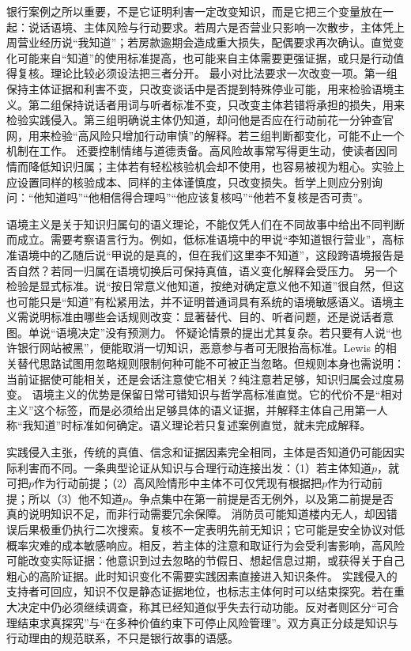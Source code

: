  银行案例之所以重要，不是它证明利害一定改变知识，而是它把三个变量放在一起：说话语境、主体风险与行动要求。若周六是否营业只影响一次散步，主体凭上周营业经历说“我知道”；若房款逾期会造成重大损失，配偶要求再次确认。直觉变化可能来自“知道”的使用标准提高，也可能来自主体需要更强证据，或只是行动值得复核。理论比较必须设法把三者分开。 最小对比法要求一次改变一项。第一组保持主体证据和利害不变，只改变谈话中是否提到特殊停业可能，用来检验语境主义。第二组保持说话者用词与听者标准不变，只改变主体若错将承担的损失，用来检验实践侵入。第三组明确说主体仍知道，却问他是否应在行动前花一分钟查官网，用来检验“高风险只增加行动审慎”的解释。若三组判断都变化，可能不止一个机制在工作。 还要控制情绪与道德责备。高风险故事常写得更生动，使读者因同情而降低知识归属；主体若有轻松核验机会却不使用，也容易被视为粗心。实验上应设置同样的核验成本、同样的主体谨慎度，只改变损失。哲学上则应分别询问：“他知道吗”“他相信得合理吗”“他应该复核吗”“他若不复核是否可责”。

语境主义是关于知识归属句的语义理论，不能仅凭人们在不同故事中给出不同判断而成立。需要考察语言行为。例如，低标准语境中的甲说“李知道银行营业”，高标准语境中的乙随后说“甲说的是真的，但在我们这里李不知道”，这段跨语境报告是否自然？若同一归属在语境切换后可保持真值，语义变化解释会受压力。 另一个检验是显式标准。说“按日常意义他知道，按绝对确定意义他不知道”很自然，但这也可能只是“知道”有松紧用法，并不证明普通词具有系统的语境敏感语义。语境主义需说明标准由哪些会话规则改变：显著替代、目的、听者问题，还是说话者意图。单说“语境决定”没有预测力。 怀疑论情景的提出尤其复杂。若只要有人说“也许银行网站被黑”，便能取消一切知识，恶意参与者可无限抬高标准。Lewis 的相关替代思路试图用忽略规则限制何种可能不可被正当忽略\parencite{lewis1996}。但规则本身也需说明：当前证据使可能相关，还是会话注意使它相关？纯注意若足够，知识归属会过度易变。 语境主义的优势是保留日常可错知识与哲学高标准直觉。它的代价不是“相对主义”这个标签，而是必须给出足够具体的语义证据，并解释主体自己用第一人称“我知道”时标准如何确定。语义理论若只复述案例直觉，就未完成解释。

实践侵入主张，传统的真值、信念和证据因素完全相同，主体是否知道仍可能因实际利害而不同\parencite{stanley2005}。一条典型论证从知识与合理行动连接出发：（1）若主体知道$p$，就可把$p$作为行动前提；（2）高风险情形中主体不可仅凭现有根据把$p$作为行动前提；所以（3）他不知道$p$。争点集中在第一前提是否无例外，以及第二前提是否真的说明知识不足，而非行动需要冗余保障。 消防员可能知道楼内无人，却因错误后果极重仍执行二次搜索。复核不一定表明先前无知识；它可能是安全协议对低概率灾难的成本敏感响应。相反，若主体的注意和取证行为会受利害影响，高风险可能改变实际证据：他意识到过去忽略的节假日、想起信息过期，或获得关于自己粗心的高阶证据。此时知识变化不需要实践因素直接进入知识条件。 实践侵入的支持者可回应，知识不仅是静态证据地位，也标志主体何时可以结束探究。若在重大决定中仍必须继续调查，称其已经知道似乎失去行动功能。反对者则区分“可合理结束求真探究”与“在多种价值约束下可停止风险管理”。双方真正分歧是知识与行动理由的规范联系，不只是银行故事的语感。


